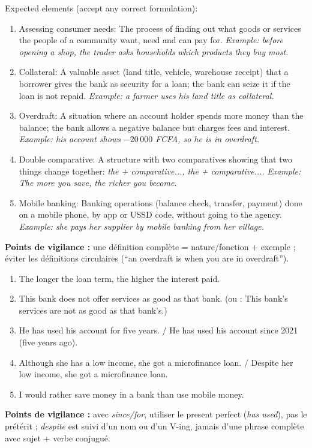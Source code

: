 \documentclass[11pt]{article}
\newcommand{\cle}[1]{{\popxbold\color{popdark}#1}}
\begin{document}
\begin{corrige}
Expected elements (accept any correct formulation):
\begin{enumerate}
    \item \cle{Assessing consumer needs}: The process of finding out what goods or services the people of a community want, need and can pay for. \emph{Example: before opening a shop, the trader asks households which products they buy most.}
    \item \cle{Collateral}: A valuable asset (land title, vehicle, warehouse receipt) that a borrower gives the bank as security for a loan; the bank can seize it if the loan is not repaid. \emph{Example: a farmer uses his land title as collateral.}
    \item \cle{Overdraft}: A situation where an account holder spends more money than the balance; the bank allows a negative balance but charges fees and interest. \emph{Example: his account shows $-20\,000$ FCFA, so he is in overdraft.}
    \item \cle{Double comparative}: A structure with two comparatives showing that two things change together: \emph{the + comparative..., the + comparative...}. \emph{Example: The more you save, the richer you become.}
    \item \cle{Mobile banking}: Banking operations (balance check, transfer, payment) done on a mobile phone, by app or USSD code, without going to the agency. \emph{Example: she pays her supplier by mobile banking from her village.}
\end{enumerate}
\textbf{Points de vigilance :} une définition complète = nature/fonction + exemple ; éviter les définitions circulaires (``an overdraft is when you are in overdraft'').
\end{corrige}

\begin{corrige}
\begin{enumerate}
    \item The longer the loan term, the higher the interest paid.
    \item This bank does not offer services as good as that bank. (ou : This bank's services are not as good as that bank's.)
    \item He has used his account for five years. / He has used his account since 2021 (five years ago).
    \item Although she has a low income, she got a microfinance loan. / Despite her low income, she got a microfinance loan.
    \item I would rather save money in a bank than use mobile money.
\end{enumerate}
\textbf{Points de vigilance :} avec \emph{since/for}, utiliser le present perfect (\emph{has used}), pas le prétérit ; \emph{despite} est suivi d'un nom ou d'un V-ing, jamais d'une phrase complète avec sujet + verbe conjugué.
\end{corrige}
\end{document}
